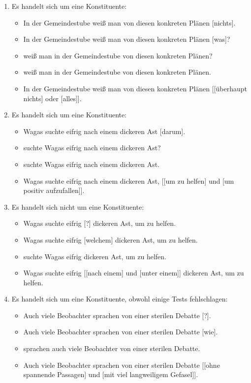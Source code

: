 \begin{enumerate}
\begin{itemize}
    \end{itemize}
  \item Es handelt sich um eine Konstituente:
    \begin{itemize}\Lf
      \item \ProTest In der Gemeindestube weiß man von diesen konkreten Plänen [nichts].
      \item \FTest In der Gemeindestube weiß man von diesen konkreten Plänen [was]?
      \item \FTest [Was] weiß man in der Gemeindestube von diesen konkreten Plänen?
      \item {} weiß man in der Gemeindestube von diesen konkreten Plänen.
      \item \KoorTest In der Gemeindestube weiß man von diesen konkreten Plänen [[überhaupt nichts] oder [alles]].
    \end{itemize}
  \item Es handelt sich um eine Konstituente:
    \begin{itemize}\Lf
      \item \ProTest \Ast Wagas suchte eifrig nach einem dickeren Ast [darum].
      \item \FTest [Warum] suchte Wagas eifrig nach einem dickeren Ast?
      \item \VfTest [Um zu helfen] suchte Wagas eifrig nach einem dickeren Ast.
      \item \KoorTest Wagas suchte eifrig nach einem dickeren Ast, [[um zu helfen] und [um positiv aufzufallen]].
    \end{itemize}
  \item Es handelt sich nicht um eine Konstituente:
    \begin{itemize}\Lf
      \item \ProTest \Ast Wagas suchte eifrig [?] dickeren Ast, um zu helfen.
      \item \FTest \Ast Wagas suchte eifrig [welchem] dickeren Ast, um zu helfen.
      \item \VfTest {} suchte Wagas eifrig dickeren Ast, um zu helfen.
      \item \KoorTest \Ast Wagas suchte eifrig [[nach einem] und [unter einem]] dickeren Ast, um zu helfen.
    \end{itemize}
  \item\label{it:insel} Es handelt sich um eine Konstituente, obwohl einige Tests fehlschlagen:
    \begin{itemize}\Lf
      \item \ProTest \Ast Auch viele Beobachter sprachen von einer sterilen Debatte [?].
      \item \FTest \Ast Auch viele Beobachter sprachen von einer sterilen Debatte [wie].
      \item \VfTest {} sprachen auch viele Beobachter von einer sterilen Debatte.
      \item \KoorTest Auch viele Beobachter sprachen von einer sterilen Debatte [[ohne spannende Passagen] und [mit viel langweiligem Gefasel]].
    \end{itemize}
\end{enumerate}

